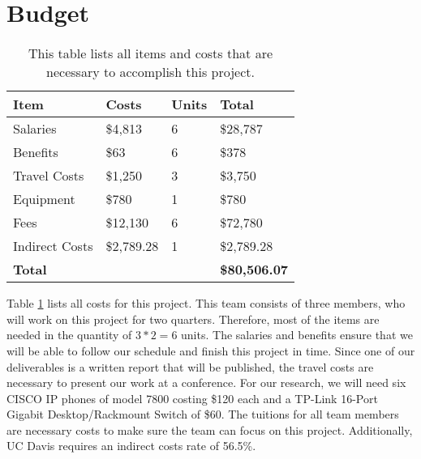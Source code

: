 \section{Budget}

\begin{table}
\centering
\caption{This table lists all items and costs that are necessary to accomplish this project.}
\label{budget}
\begin{tabular}{|l|l|l|l|}
\hline
\textbf{Item}  & \textbf{Costs} & \textbf{Units} & \textbf{Total}        \\ \hline
Salaries       & \$4,813        & 6              & \$28,787              \\ \hline
Benefits       & \$63           & 6              & \$378                 \\ \hline
Travel Costs   & \$1,250        & 3              & \$3,750               \\ \hline
Equipment      & \$780          & 1              & \$780                 \\ \hline
Fees           & \$12,130       & 6              & \$72,780              \\ \hline
Indirect Costs & \$2,789.28     & 1              & \$2,789.28           \\ \hline
\textbf{Total} &                &                & \textbf{\$80,506.07} \\ \hline
\end{tabular}
\end{table}

Table \ref{budget} lists all costs for this project. This team consists of three members, who will work on this project for two quarters. Therefore, most of the items are needed in the quantity of $3*2=6$ units. The salaries and benefits ensure that we will be able to follow our schedule and finish this project in time. Since one of our deliverables is a written report that will be published, the travel costs are necessary to present our work at a conference. For our research, we will need six CISCO IP phones of model 7800 costing \$120 each and a TP-Link 16-Port Gigabit Desktop/Rackmount Switch of \$60. The tuitions for all team members are necessary costs to make sure the team can focus on this project. Additionally, UC Davis requires an indirect costs rate of 56.5\%.
